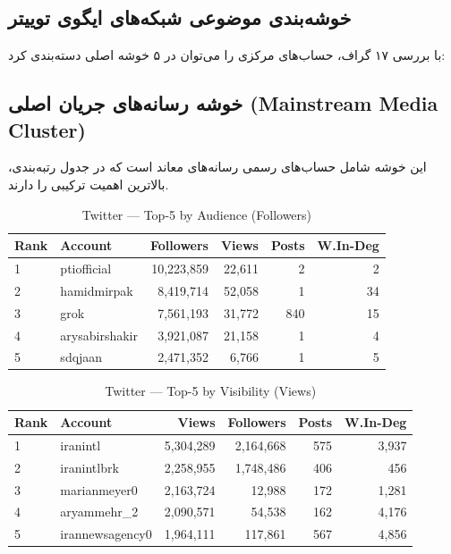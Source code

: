 \documentclass{article}
\begin{document}
\subsection{خوشه‌بندی موضوعی شبکه‌های ایگوی توییتر}
با بررسی ۱۷ گراف، حساب‌های مرکزی را می‌توان در ۵ خوشه اصلی دسته‌بندی کرد:

\subsection{خوشه رسانه‌های جریان اصلی (Mainstream Media Cluster)}
این خوشه شامل حساب‌های رسمی رسانه‌های معاند است که در جدول رتبه‌بندی، بالاترین اهمیت ترکیبی را دارند.




\begin{table}[h!]
	\centering
	\begin{tabular}{llrrrr}
		\toprule
		Rank & Account & Followers & Views & Posts & W.In-Deg \\
		\midrule
		1 & ptiofficial    & 10,223,859 & 22,611 & 2   & 2   \\
		2 & hamidmirpak    & 8,419,714  & 52,058 & 1   & 34  \\
		3 & grok           & 7,561,193  & 31,772 & 840 & 15  \\
		4 & arysabirshakir & 3,921,087  & 21,158 & 1   & 4   \\
		5 & sdqjaan        & 2,471,352  & 6,766  & 1   & 5   \\
		\bottomrule
	\end{tabular}
	\caption{Twitter — Top-5 by Audience (Followers)}
\end{table}


\begin{table}[h!]
	\centering
	\begin{tabular}{llrrrr}
		\toprule
		Rank & Account & Views & Followers & Posts & W.In-Deg \\
		\midrule
		1 & iranintl        & 5,304,289 & 2,164,668 & 575 & 3,937 \\
		2 & iranintlbrk     & 2,258,955 & 1,748,486 & 406 & 456   \\
		3 & marianmeyer0    & 2,163,724 & 12,988    & 172 & 1,281 \\
		4 & aryammehr\_2    & 2,090,571 & 54,538    & 162 & 4,176 \\
		5 & irannewsagency0 & 1,964,111 & 117,861   & 567 & 4,856 \\
		\bottomrule
	\end{tabular}
	\caption{Twitter — Top-5 by Visibility (Views)}
\end{table}
\end{document}
